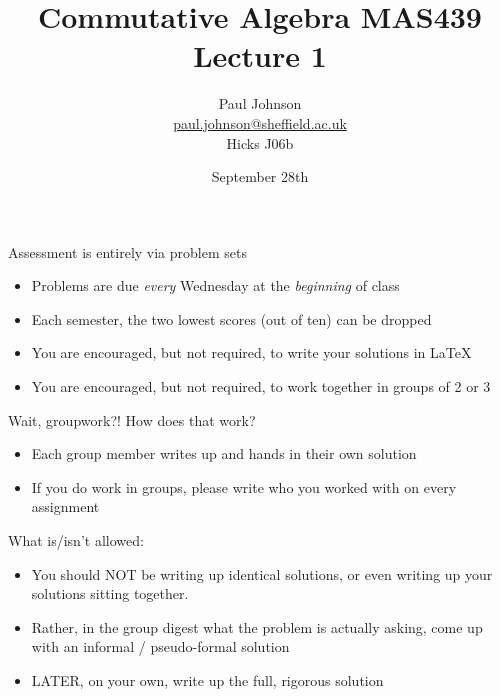 \documentclass{beamer}
\title{Commutative Algebra MAS439 \\ Lecture 1}
\author{Paul Johnson \\ \href{mailto:paul.johnson@sheffield.ac.uk}{paul.johnson@sheffield.ac.uk} \\ Hicks J06b}
\date{September 28th}
\begin{document}
\begin{frame}
\titlepage
\end{frame}


\begin{frame}{Assessment is entirely via problem sets}

\begin{itemize}
\item Problems are due \emph{every} Wednesday at the \emph{beginning} of class
\item Each semester, the two lowest scores (out of ten) can be dropped
\item You are encouraged, but not required, to write your solutions in \LaTeX
\item You are encouraged, but not required, to work together in groups of 2 or 3
\end{itemize}
\end{frame}


\begin{frame}{Wait, groupwork?! How does that work?}

\begin{itemize}
\item Each group member writes up and hands in their own solution
\item If you do work in groups, please write who you worked with on every assignment
\end{itemize}

\begin{block}{What is/isn't allowed:}
\begin{itemize}
\item You should \alert{NOT} be writing up identical solutions, or even writing up your solutions sitting together.  
\item Rather, in the group digest what the problem is actually asking, come up with an informal / pseudo-formal solution
\item \alert{LATER}, on your own, write up the full, rigorous solution
\end{itemize}
\end{block}

\end{frame}
\end{document}
